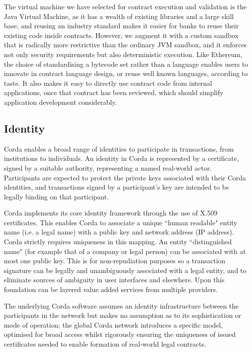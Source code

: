 \documentclass{article}
\begin{document}
The virtual machine we have selected for contract execution and validation is the Java Virtual Machine\cite{JVM}, as it has a wealth of existing libraries and a large skill base, and reusing an industry standard makes it easier for banks to reuse their existing code inside contracts. However, we augment it with a custom sandbox that is radically more restrictive than the ordinary JVM sandbox, and it enforces not only security requirements but also deterministic execution. Like Ethereum\cite{Ethereum}, the choice of standardising a bytecode set rather than a language enables users to innovate in contract language design, or reuse well known languages, according to taste. It also makes it easy to directly use contract code from internal applications, once that contract has been reviewed, which should simplify application development considerably.

\subsection{Identity}
Corda enables a broad range of identities to participate in transactions, from institutions to individuals. An identity in Corda is represented by a certificate, signed by a suitable authority, representing a named real-world actor. Participants are expected to protect the private keys associated with their Corda identities, and transactions signed by a participant's key are intended to be legally binding on that participant.

Corda implements its core identity framework through the use of X.509 certificates. This enables Corda to associate a unique ``human readable" entity name (i.e. a legal name) with a public key and network address (IP address). Corda strictly requires uniqueness in this mapping. An entity ``distinguished name" (for example that of a company or legal person) can be associated with at most one public key. This is for non-repudiation purposes so a transaction signature can be legally and unambiguously associated with a legal entity, and to eliminate sources of ambiguity in user interfaces and elsewhere. Upon this foundation can be layered value added services from multiple providers.

The underlying Corda software assumes an identity infrastructure between the participants in the network but makes no assumption as to its sophistication or mode of operation; the global Corda network introduces a specific model, optimised for broad access whilst rigorously ensuring the uniqueness of issued certificates needed to enable formation of real-world legal contracts.
\end{document}
